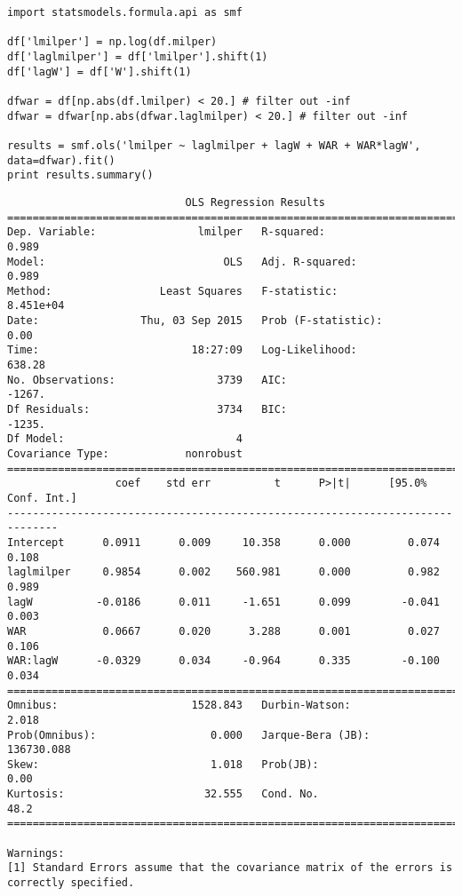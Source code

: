\documentclass[12pt,fleqn]{article}\usepackage{common}
\begin{document}
\begin{verbatim}
import statsmodels.formula.api as smf

df['lmilper'] = np.log(df.milper)
df['laglmilper'] = df['lmilper'].shift(1)
df['lagW'] = df['W'].shift(1)

dfwar = df[np.abs(df.lmilper) < 20.] # filter out -inf
dfwar = dfwar[np.abs(dfwar.laglmilper) < 20.] # filter out -inf

results = smf.ols('lmilper ~ laglmilper + lagW + WAR + WAR*lagW', data=dfwar).fit()
print results.summary()
\end{verbatim}

\begin{verbatim}
                            OLS Regression Results                            
==============================================================================
Dep. Variable:                lmilper   R-squared:                       0.989
Model:                            OLS   Adj. R-squared:                  0.989
Method:                 Least Squares   F-statistic:                 8.451e+04
Date:                Thu, 03 Sep 2015   Prob (F-statistic):               0.00
Time:                        18:27:09   Log-Likelihood:                 638.28
No. Observations:                3739   AIC:                            -1267.
Df Residuals:                    3734   BIC:                            -1235.
Df Model:                           4                                         
Covariance Type:            nonrobust                                         
==============================================================================
                 coef    std err          t      P>|t|      [95.0% Conf. Int.]
------------------------------------------------------------------------------
Intercept      0.0911      0.009     10.358      0.000         0.074     0.108
laglmilper     0.9854      0.002    560.981      0.000         0.982     0.989
lagW          -0.0186      0.011     -1.651      0.099        -0.041     0.003
WAR            0.0667      0.020      3.288      0.001         0.027     0.106
WAR:lagW      -0.0329      0.034     -0.964      0.335        -0.100     0.034
==============================================================================
Omnibus:                     1528.843   Durbin-Watson:                   2.018
Prob(Omnibus):                  0.000   Jarque-Bera (JB):           136730.088
Skew:                           1.018   Prob(JB):                         0.00
Kurtosis:                      32.555   Cond. No.                         48.2
==============================================================================

Warnings:
[1] Standard Errors assume that the covariance matrix of the errors is correctly specified.
\end{verbatim}
\end{document}
